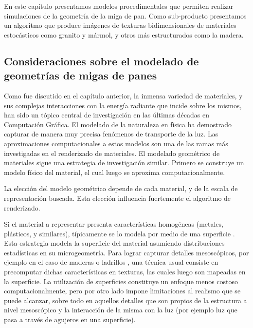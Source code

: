 En este capítulo presentamos modelos procedimentales que permiten realizar simulaciones de la geometría de la miga de pan.
Como sub-producto presentamos un algoritmo que produce imágenes de texturas bidimensionales de materiales estocásticos como granito y mármol, y otros más estructurados como la madera.

\subsection{Consideraciones sobre el modelado de geometrías de migas de panes}
Como fue discutido en el capítulo anterior, la inmensa variedad de materiales, y sus complejas interacciones con la energía radiante que incide sobre los mismos, han sido un tópico central de investigación en las últimas décadas en Computación Gráfica.
El modelado de la naturaleza en física ha demostrado capturar de manera muy precisa fenómenos de transporte de la luz.
Las aproximaciones computacionales a estos modelos son una de las ramas más investigadas en el renderizado de materiales.
El modelado geométrico de materiales sigue una estrategia de investigación similar. Primero se construye un modelo físico del material, el cual luego se aproxima computacionalmente.

La elección del modelo geométrico depende de cada material, y de la escala de representación buscada.
Esta elección influencia fuertemente el algoritmo de renderizado. 


Si el material a representar presenta características homogéneas (metales, plásticos, y similares), típicamente se lo modela por medio de una superficie \cite{Neumann1999}.
Esta estrategia modela la superficie del material asumiendo distribuciones estadísticas en su microgeometría.
Para lograr capturar detalles mesoscópicos, por ejemplo en el caso de maderas o ladrillos \cite{Lefebvre2000}, una técnica usual consiste en precomputar dichas características en texturas, las cuales luego son mapeadas en la superficie.
La utilización de superficies constituye un enfoque menos costoso computacionalmente, pero por otro lado impone limitaciones al realismo que se puede alcanzar, sobre todo en aquellos detalles que son propios de la estructura a nivel mesoscópico y la interacción de la misma con la luz (por ejemplo luz que pasa a través de agujeros en una superficie).

